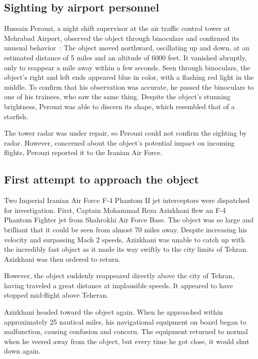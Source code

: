 \subsection{Sighting by airport personnel}

Hussain Perouzi, a night shift supervisor at the air traffic control tower at Mehrabad Airport,
observed the object through binoculars and confirmed its unusual behavior~\cite{Sprague2022Sep}:
The object moved northward, oscillating up and down, at an estimated distance of 5 miles and an altitude of 6000 feet.
It vanished abruptly, only to reappear a mile away within a few seconds.
Seen through binoculars, the object's right and left ends appeared blue in color,
with a flashing red light in the middle.
To confirm that his observation was accurate, he passed the binoculars to one of his trainees, who saw the same thing.
Despite the object's stunning brightness, Perouzi was able to discern its shape, which resembled that of a starfish.

The tower radar was under repair, so Perouzi could not confirm the sighting by radar.
However, concerned about the object's potential impact on incoming flights, Perouzi reported it to the Iranian Air Force.


\subsection{First attempt to approach the object}

Two Imperial Iranian Air Force F-4 Phantom II jet interceptors were dispatched for investigation.
First, Captain Mohammad Reza Azizkhani flew an F-4 Phantom Fighter jet from Shahrokhi Air Force Base.
The object was so large and brilliant that it could be seen from almost 70 miles away.
Despite increasing his velocity and surpassing Mach 2 speeds, Azizkhani was unable to catch up with the incredibly fast object as it
made its way swiftly to the city limits of Tehran.
Azizkhani was then ordered to return.

However, the object suddenly reappeared directly above the city of Tehran, having traveled a great distance at implausible speeds.
It appeared to have stopped mid-flight above Teheran.

Azizkhani headed toward the object again. When he approached within approximately 25 nautical miles,
his navigational equipment on board began to malfunction, causing confusion and concern.
The equipment returned to normal when he veered away from the object, but every time he got close,
it would shut down again.

